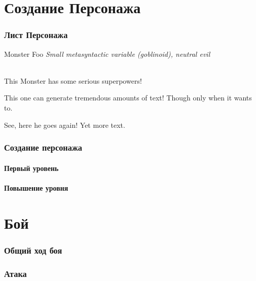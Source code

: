\documentclass[10pt,twoside,twocolumn,openany]{book}
\begin{document}
\selectfont
\tableofcontents

\part{Создание Персонажа}
\section{Лист Персонажа}
\begin{monsterbox}{Monster Foo}
	\textit{Small metasyntactic variable (goblinoid), neutral evil}\\
	\hline
	\basics[armorclass = 12, hitpoints = 16 (3d8+3), speed = 50 ft]
	\hline
	\stats[STR = \stat{12}, DEX = \stat{7}]
	\hline
	\details[languages = {Common Lisp, Erlang},]
	\hline \\[1mm]
	\begin{monsteraction}
		This Monster has some serious superpowers!
	\end{monsteraction}
	\begin{monsteraction}
		This one can generate tremendous amounts of text! Though only when it wants to.
	\end{monsteraction}
	\begin{monsteraction}
		See, here he goes again! Yet more text.
	\end{monsteraction}
\end{monsterbox}

\section{Создание персонажа}
\lipsum[1]
\subsection{Первый уровень}
\lipsum[1]
\subsection{Повышение уровня}
\lipsum[1]

\part{Бой}
\section{Общий ход боя}
\lipsum[1]
\section{Атака}
\lipsum[1]
\end{document}
